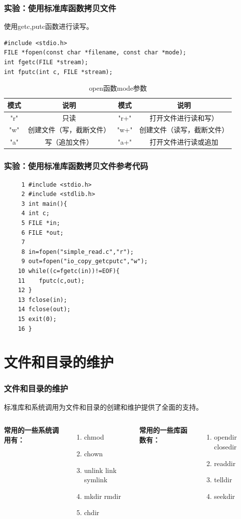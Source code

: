 \documentclass{beamer}
\begin{document}
\begin{frame}[fragile]
\frametitle{实验：使用标准库函数拷贝文件}
使用getc,putc函数进行读写。
\begin{lstlisting}
#include <stdio.h>
FILE *fopen(const char *filename, const char *mode);
int fgetc(FILE *stream);
int fputc(int c, FILE *stream);

\end{lstlisting}
\begin{table}
\begin{tabular}{cccc}
\toprule
\textbf{模式} & \textbf{说明} & \textbf{模式} & \textbf{说明} \\
\midrule
"r" & 只读 & "r+" & 打开文件进行读和写） \\
"w" & 创建文件（写，截断文件） & "w+"& 创建文件（读写，截断文件） \\
"a" & 写（追加文件） & "a+"& 打开文件进行读或追加 \\
\bottomrule
\end{tabular}
\caption{open函数mode参数}
\end{table}
\end{frame}
\begin{frame}[fragile]
\frametitle{实验：使用标准库函数拷贝文件参考代码}
\begin{lstlisting}
     1 #include <stdio.h>
     2 #include <stdlib.h>
     3 int main(){
     4 int c;
     5 FILE *in;
     6 FILE *out;
     7
     8 in=fopen("simple_read.c","r");
     9 out=fopen("io_copy_getcputc","w");
    10 while((c=fgetc(in))!=EOF){
    11    fputc(c,out);
    12 }
    13 fclose(in);
    14 fclose(out);
    15 exit(0);
    16 }
\end{lstlisting}
\end{frame}
\section{文件和目录的维护}
\begin{frame}
\frametitle{文件和目录的维护}
标准库和系统调用为文件和目录的创建和维护提供了全面的支持。
\begin{columns}


\textbf{常用的一些系统调用有：}
\begin{enumerate}
\item
chmod
\item
chown
\item
unlink	 link 		symlink
\item
mkdir	rmdir
\item
chdir
\end{enumerate}

\textbf{常用的一些库函数有：}
\begin{enumerate}
\item
opendir	closedir
\item
readdir
\item
telldir
\item
seekdir
\end{enumerate}
\end{columns}
\end{frame}
\end{document}

